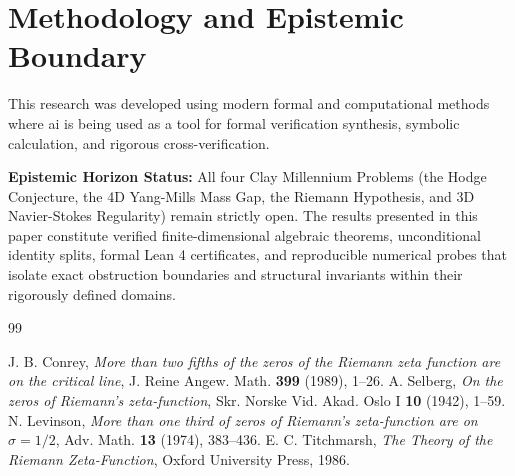 \documentclass[11pt,a4paper]{article}
\theoremstyle{definition}
\begin{document}
\section{Methodology and Epistemic Boundary}
\noindent This research was developed using modern formal and computational methods where ai is being used as a tool for formal verification synthesis, symbolic calculation, and rigorous cross-verification.

\vspace{0.5em}
\noindent\textbf{Epistemic Horizon Status:} All four Clay Millennium Problems (the Hodge Conjecture, the 4D Yang-Mills Mass Gap, the Riemann Hypothesis, and 3D Navier-Stokes Regularity) remain strictly open. The results presented in this paper constitute verified finite-dimensional algebraic theorems, unconditional identity splits, formal Lean 4 certificates, and reproducible numerical probes that isolate exact obstruction boundaries and structural invariants within their rigorously defined domains.

\begin{thebibliography}{99}

 J. B. Conrey, \emph{More than two fifths of the zeros of the Riemann zeta function are on the critical line}, J. Reine Angew. Math. \textbf{399} (1989), 1--26.
 A. Selberg, \emph{On the zeros of Riemann's zeta-function}, Skr. Norske Vid. Akad. Oslo I \textbf{10} (1942), 1--59.
 N. Levinson, \emph{More than one third of zeros of Riemann's zeta-function are on $\sigma = 1/2$}, Adv. Math. \textbf{13} (1974), 383--436.
 E. C. Titchmarsh, \emph{The Theory of the Riemann Zeta-Function}, Oxford University Press, 1986.

\end{thebibliography}
\end{document}
